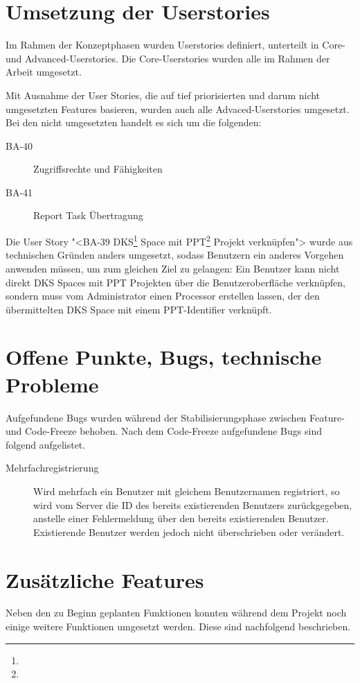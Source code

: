 			
	\section{Umsetzung der Userstories}
		Im Rahmen der Konzeptphasen wurden Userstories definiert, unterteilt in Core- und Advanced-Userstories.
		Die Core-Userstories wurden alle im Rahmen der Arbeit umgesetzt.
		
		Mit Ausnahme der User Stories, die auf tief priorisierten und darum nicht umgesetzten Features basieren, wurden auch alle Advaced-Userstories umgesetzt.
		Bei den nicht umgesetzten handelt es sich um die folgenden:
		
		\begin{description}
			\item[BA-40] Zugriffsrechte und Fähigkeiten
			\item[BA-41] Report Task Übertragung
		\end{description}
		
		Die User Story "<BA-39 DKS\footnote{\dks} Space mit PPT\footnote{\ppt} Projekt verknüpfen"> wurde aus technischen Gründen anders umgesetzt, 
		sodass Benutzern ein anderes Vorgehen anwenden müssen, um zum gleichen Ziel zu gelangen: Ein Benutzer kann nicht direkt DKS Spaces mit PPT Projekten über die Benutzeroberfläche verknüpfen, sondern muss vom Administrator einen Processor erstellen lassen, der den übermittelten DKS Space mit einem PPT-Identifier verknüpft.

	
	\section{Offene Punkte, Bugs, technische Probleme}
		Aufgefundene Bugs wurden während der Stabilisierungsphase zwischen Feature- und Code-Freeze behoben. Nach dem Code-Freeze aufgefundene Bugs sind folgend aufgelistet.
	
		\begin{description}
			\item[Mehrfachregistrierung] Wird mehrfach ein Benutzer mit gleichem Benutzernamen registriert, so wird vom Server die ID des bereits existierenden Benutzers zurückgegeben, anstelle einer Fehlermeldung über den bereits existierenden Benutzer.
			Existierende Benutzer werden jedoch nicht überschrieben oder verändert.
		\end{description}
	
	
	\section{Zusätzliche Features}
		Neben den zu Beginn geplanten Funktionen konnten während dem Projekt noch einige weitere Funktionen umgesetzt werden.
		Diese sind nachfolgend beschrieben.

